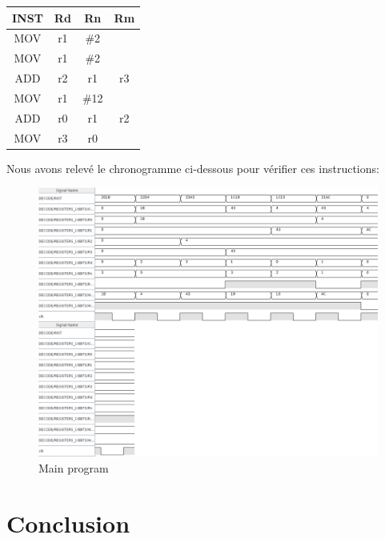 \documentclass[a4paper]{article} %
\begin{document}
\begin{tabular}{|c|c|c|c|}
    \hline
    INST & Rd & Rn  & Rm  \\
    \hline
    MOV  & r1 & \#2  &    \\
    \hline
    MOV  & r1 & \#2  &    \\
    \hline
    ADD  & r2 & r1   & r3 \\
    \hline
    MOV  & r1 & \#12 &    \\
    \hline
    ADD  & r0 & r1   & r2 \\
    \hline
    MOV  & r3 & r0   &    \\
    \hline
\end{tabular}

Nous avons relevé le chronogramme ci-dessous pour vérifier ces instructions:

\begin{figure}[H]
    \centering
    \includegraphics[width=1\textwidth]{src/CHRONO_DECODE.png}
    \caption{Main program}
    \label{main_img}
\end{figure}

\section{Conclusion}
\end{document}
